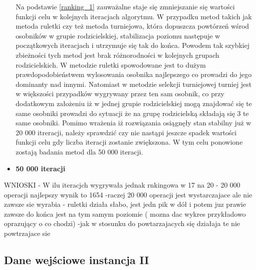 \begin{itemize}
Na podstawie \ref{ranking_1} zauważalne staje się zmniejszanie się wartości funkcji celu w kolejnych iteracjach algorytmu.  W przypadku metod takich jak metoda ruletki czy też metoda turniejowa, która dopuszcza powtórzeń wśrod osobników w grupie rodzicielskiej, stabilizacja poziomu następuje w początkowych iteracjach i utrzymuje się tak do końca. Powodem tak szybkiej zbieżności tych metod jest brak różnorodności w kolejnych grupach rodzicielskich. W metodzie ruletki spowodowane jest to dużym prawdopodobieństwem wylosowania osobnika najlepszego co prowadzi do jego dominanty nad innymi. Natomiast w metodzie selekcji turniejowej turniej jest w większości przypadków wygrywany przez ten sam osobnik, co przy dodatkowym założeniu iż w jednej grupie rodzicielskiej mogą znajdować się te same osobniki prowadzi do sytuacji że na grupę rodzicielską składają się 3 te same osobniki. Pomimo wrażenia iż rozwiązania osiągnęły stan stabilny już w 20 000 itreracji, należy sprawdzić czy nie nastąpi jeszcze spadek wartości funkcji celu gdy liczba iteracji zostanie zwiększona. W tym celu ponowione zostają badania metod dla 50 000 iteracji.\\

\item  \textbf{50 000 iteracji}
\end{itemize}



WNIOSKI
- W ilu iteracjch wygrywała jednak rnkingowa w 17 na 20
- 20 000 operacji najlepszy wynik to 1654
-raczej 20 000 operacji jest wystarczajace ale nie zawsze sie wyrabia
- ruletki działa słabo, jest jedn pik w dół i potem juz prawie zawsze do końca jest na tym samym poziomie ( mozna dac wykres przykładowo oprazujący o co chodzi)
-jak w stosunku do powtarzajacych się działaja te nie powtrzajace sie

\subsection{Dane wejściowe instancja II}
